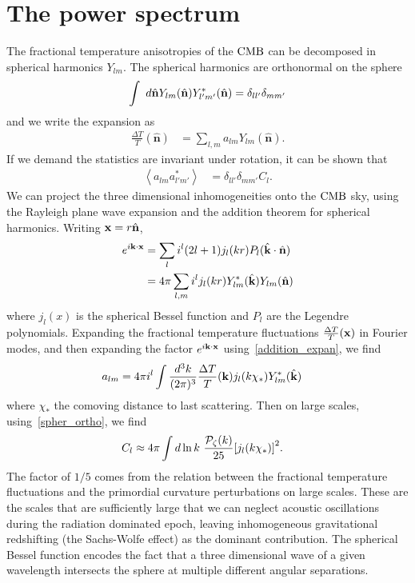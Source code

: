     \section{The power spectrum}\label{sec:power_spec_estimator}
    The fractional temperature anisotropies of the $\text{CMB}$ can be decomposed in spherical
    harmonics $Y_{lm}$.
    The spherical harmonics are orthonormal on the sphere
    \begin{align}\label{spher_ortho}
        \int~d\hat{\mathbf{n}}Y_{lm}(\hat{\mathbf{n}})Y^*_{l'm'}(\hat{\mathbf{n}}) = \delta_{ll'}\delta_{mm'}
    \end{align}
    and we write the expansion as
    \begin{align}
        \frac{\Delta T}{T}(\hat{\mathbf{n}}) &= \sum_{l,m} a_{lm}Y_{lm}(\hat{\mathbf{n}}).
    \end{align}
    If we demand the statistics are invariant under rotation, it can be shown that
    \begin{align}
        \left<a_{lm}a^*_{l'm'}\right> &= \delta_{ll'}\delta_{mm'}C_l.
    \end{align}
    We can project the three dimensional inhomogeneities onto the $\text{CMB}$ sky,
    using the Rayleigh plane wave expansion and the addition theorem
    for spherical harmonics. Writing $\mathbf{x}=r\hat{\mathbf{n}}$,
    \begin{align}
        e^{i\mathbf{k}\cdot\mathbf{x}} &= \sum_l i^l(2l+1)j_l(kr)P_l(\hat{\mathbf{k}}\cdot\hat{\mathbf{n}})\\
                    &= 4\pi\sum_{l,m}i^l j_l(kr)Y^*_{lm}(\hat{\mathbf{k}})Y_{lm}(\hat{\mathbf{n}})\label{addition_expan}
    \end{align}
    where $j_l(x)$ is the spherical Bessel function
    and $P_l$ are the Legendre polynomials.
    Expanding the fractional temperature fluctuations
    $\frac{\Delta T}{T}(\mathbf{x})$ in Fourier modes,
    and then expanding the factor $e^{i\mathbf{k}\cdot\mathbf{x}}$ using~\eqref{addition_expan},
    we find
    \begin{align}
        a_{lm} &= 4\pi i^l\int\frac{d^3k}{(2\pi)^3}\frac{\Delta T}{T}(\mathbf{k})j_l(k\chi_*)Y^*_{lm}(\hat{\mathbf{k}})
    \end{align}
    where $\chi_*$ the comoving distance to last scattering. 
    Then on large scales, using~\eqref{spher_ortho}, we find
    \begin{align}\label{sachs_cl_example}
        C_l &\approx 4\pi\int d\ln k~\frac{\mathcal{P}_{\mathcal{\zeta}}(k)}{25}{\left[
            j_l(k\chi_*)
            \right]}^2.
    \end{align}
    The factor of $1/5$ comes from the relation between the fractional temperature
    fluctuations and the primordial curvature perturbations on large scales. These are the scales
    that are sufficiently large that we can neglect acoustic oscillations during the
    radiation dominated epoch, leaving inhomogeneous gravitational redshifting
    (the Sachs-Wolfe effect) as the dominant contribution.
    The spherical Bessel function encodes the fact that a three dimensional
    wave of a given wavelength intersects the sphere at multiple different angular separations.


